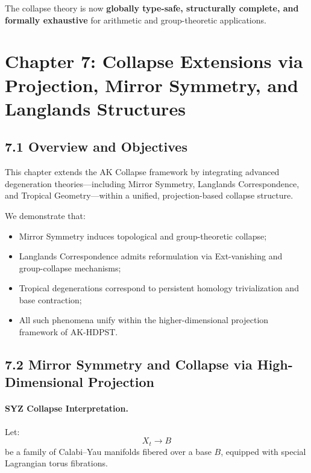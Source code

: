 \documentclass[11pt]{article}
\begin{document}
The collapse theory is now \textbf{globally type-safe, structurally complete, and formally exhaustive} for arithmetic and group-theoretic applications.



\section{Chapter 7: Collapse Extensions via Projection, Mirror Symmetry, and Langlands Structures}

\subsection*{7.1 Overview and Objectives}

This chapter extends the AK Collapse framework by integrating advanced degeneration theories—including Mirror Symmetry, Langlands Correspondence, and Tropical Geometry—within a unified, projection-based collapse structure.

We demonstrate that:

\begin{itemize}
    \item Mirror Symmetry induces topological and group-theoretic collapse;
    \item Langlands Correspondence admits reformulation via Ext-vanishing and group-collapse mechanisms;
    \item Tropical degenerations correspond to persistent homology trivialization and base contraction;
    \item All such phenomena unify within the higher-dimensional projection framework of AK-HDPST.
\end{itemize}

\subsection*{7.2 Mirror Symmetry and Collapse via High-Dimensional Projection}

\paragraph{SYZ Collapse Interpretation.}
Let:
\[
X_t \longrightarrow B
\]
be a family of Calabi–Yau manifolds fibered over a base \( B \), equipped with special Lagrangian torus fibrations.
\end{document}
